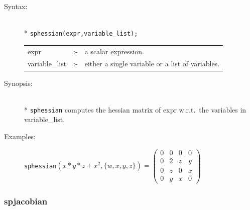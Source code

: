 \begin{description}
\item[Syntax:]\mbox{}\\*
 \texttt{sphessian(expr,variable\_list);}\\[2mm]
\begin{tabular}{l l l}
expr           &:-& a scalar expression. \\
variable\_list &:-& either a single variable or a list of variables.
\end{tabular}

\item[Synopsis:]\mbox{}\\*
                \texttt{sphessian} computes the hessian matrix of expr w.r.t.\
                the variables in variable\_list.

\item[Examples:]
\hspace*{0.1in}
\texttt{sphessian}\((x*y*z+x^2,\{w,x,y,z\})  =
\begin{pmatrix} 0 & 0 & 0 & 0 \\ 0 & 2 & z & y \\ 0 & z & 0
& x \\ 0 & y & x & 0
\end{pmatrix}\)
\end{description}

\subsubsection{spjacobian}
\label{sparse:spjacobian}
\hypertarget{operator:SPJACOBIAN}{}

